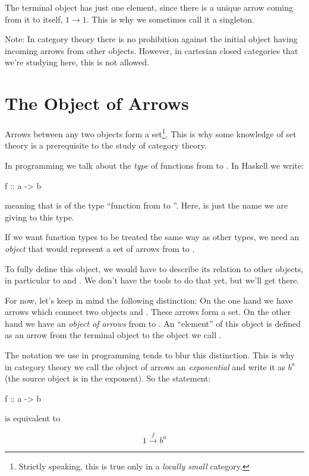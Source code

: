 \documentclass[DaoFP]{subfiles}
\begin{document}
The terminal object has just one element, since there is a unique arrow coming from it to itself, $ 1 \to 1$. This is why we sometimes call it a singleton. 

Note: In category theory there is no prohibition against the initial object having incoming arrows from other objects. However, in cartesian closed categories that we're studying here, this is not allowed.

\section{The Object of Arrows}

Arrows between any two objects form a set\footnote{Strictly speaking, this is true only in a \emph{locally small} category.}. This is why some knowledge of set theory is a prerequisite to the study of category theory. 

In programming we talk about the \emph{type} of functions from  to . In Haskell we write:
\begin{haskell}
f :: a -> b
\end{haskell}
meaning that  is of the type ``function from  to ''. Here,  is just the name we are giving to this type. 

If we want function types to be treated the same way as other types, we need an \emph{object} that would represent a set of arrows from  to .

To fully define this object, we would have to describe its relation to other objects, in particular to  and . We don't have the tools to do that yet, but we'll get there. 

For now, let's keep in mind the following distinction: On the one hand we have arrows which connect two objects  and . These arrows form a set. On the other hand we have an \emph{object of arrows} from   to . An ``element'' of this object is defined as an arrow from the terminal object \hask{()} to the object we call . 

The notation we use in programming tends to blur this distinction. This is why in category theory we call the object of arrows an \emph{exponential} and write it as $ b^a$ (the source object is in the exponent). So the statement:
\begin{haskell}
f :: a -> b
\end{haskell}
is equivalent to

\[ 1 \xrightarrow f b^a\]
\end{document}

